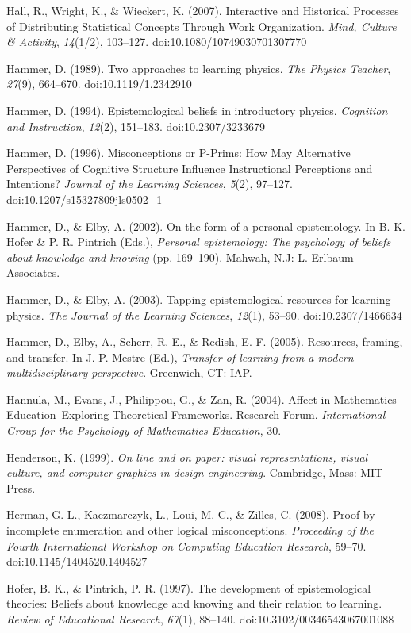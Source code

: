 Hall, R., Wright, K., \& Wieckert, K. (2007). Interactive and Historical
Processes of Distributing Statistical Concepts Through Work
Organization. \emph{Mind, Culture \& Activity}, \emph{14}(1/2),
103--127. doi:10.1080/10749030701307770

Hammer, D. (1989). Two approaches to learning physics. \emph{The Physics
Teacher}, \emph{27}(9), 664--670. doi:10.1119/1.2342910

Hammer, D. (1994). Epistemological beliefs in introductory physics.
\emph{Cognition and Instruction}, \emph{12}(2), 151--183.
doi:10.2307/3233679

Hammer, D. (1996). Misconceptions or P-Prims: How May Alternative
Perspectives of Cognitive Structure Influence Instructional Perceptions
and Intentions? \emph{Journal of the Learning Sciences}, \emph{5}(2),
97--127. doi:10.1207/s15327809jls0502\_1

Hammer, D., \& Elby, A. (2002). On the form of a personal epistemology.
In B. K. Hofer \& P. R. Pintrich (Eds.), \emph{Personal epistemology:
The psychology of beliefs about knowledge and knowing} (pp. 169--190).
Mahwah, N.J: L. Erlbaum Associates.

Hammer, D., \& Elby, A. (2003). Tapping epistemological resources for
learning physics. \emph{The Journal of the Learning Sciences},
\emph{12}(1), 53--90. doi:10.2307/1466634

Hammer, D., Elby, A., Scherr, R. E., \& Redish, E. F. (2005). Resources,
framing, and transfer. In J. P. Mestre (Ed.), \emph{Transfer of learning
from a modern multidisciplinary perspective}. Greenwich, CT: IAP.

Hannula, M., Evans, J., Philippou, G., \& Zan, R. (2004). Affect in
Mathematics Education--Exploring Theoretical Frameworks. Research Forum.
\emph{International Group for the Psychology of Mathematics Education},
30.

Henderson, K. (1999). \emph{On line and on paper: visual
representations, visual culture, and computer graphics in design
engineering}. Cambridge, Mass: MIT Press.

Herman, G. L., Kaczmarczyk, L., Loui, M. C., \& Zilles, C. (2008). Proof
by incomplete enumeration and other logical misconceptions.
\emph{Proceeding of the Fourth International Workshop on Computing
Education Research}, 59--70. doi:10.1145/1404520.1404527

Hofer, B. K., \& Pintrich, P. R. (1997). The development of
epistemological theories: Beliefs about knowledge and knowing and their
relation to learning. \emph{Review of Educational Research},
\emph{67}(1), 88--140. doi:10.3102/00346543067001088

